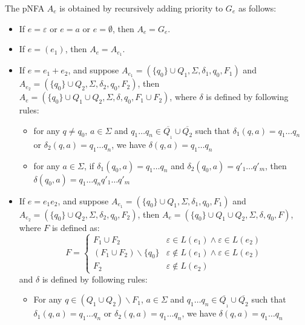 The pNFA $A_e$ is obtained by recursively adding priority to $G_e$ as follows:
\begin{itemize}
  \item If $e = \varepsilon$ or $e = a$ or $e = \emptyset$, then $A_e = G_e$.
  
  \item If $e = (e_1)$, then $A_e = A_{e_1}$.
  
  \item If $e = e_1 + e_2$, and suppose $A_{e_1} = (\{ q_0 \} \cup Q_1,
  \Sigma, \delta_1, q_0, F_1)$ and $A_{e_2} = (\{ q_0 \} \cup Q_2, \Sigma,
  \delta_2, q_0, F_2)$, then $A_e = (\{ q_0 \} \cup Q_1 \cup Q_2, \Sigma,
  \delta, q_0, F_1 \cup F_2)$, where $\delta$ is defined by following rules:
  \begin{itemize}
    \item for any $q \neq q_0$, $a \in \Sigma$ and $q_1 \ldots q_n \in
    \overline{Q_{_1}} \cup \overline{Q_2}$ such that $\delta_1 (q, a) = q_1
    \ldots q_n$ or $\delta_2 (q, a) = q_1 \ldots q_n$, we have $\delta (q, a)
    = q_1 \ldots q_n$
    
    \item for any $a \in \Sigma$, if $\delta_1 (q_0, a) = q_1 \ldots q_n$ and
    $\delta_2 (q_0, a) = q'_1 \ldots q'_m$, then $\delta (q_0, a) = q_1 \ldots
    q_n q'_1 \ldots q'_m$
  \end{itemize}
  \item If $e = e_1 e_2$, and suppose $A_{e_1} = (\{ q_0 \} \cup Q_1, \Sigma,
  \delta_1, q_0, F_1)$ and $A_{e_2} = (\{ q_0 \} \cup Q_2, \Sigma, \delta_2,
  q_0, F_2)$, then $A_e = (\{ q_0 \} \cup Q_1 \cup Q_2, \Sigma, \delta, q_0,
  F)$, where $F$ is defined as:
  \[ F = \left\{ \begin{array}{ll}
       F_1 \cup F_2 & \varepsilon \in L (e_1) \wedge \varepsilon \in L (e_2)\\
       (F_1 \cup F_2) \backslash \{ q_0 \} & \varepsilon \nin L (e_1) \wedge
       \varepsilon \in L (e_2)\\
       F_2 & \varepsilon \nin L (e_2)
     \end{array} \right. \]
  and $\delta$ is defined by following rules:
  \begin{itemize}
    \item For any $q \in (Q_1 \cup Q_2) \backslash F_1$, $a \in \Sigma$ and
    $q_1 \ldots q_n \in \overline{Q_{_1}} \cup \overline{Q_2}$ such that
    $\delta_1 (q, a) = q_1 \ldots q_n$ or $\delta_2 (q, a) = q_1 \ldots q_n$,
    we have $\delta (q, a) = q_1 \ldots q_n$
    

\end{itemize}
\end{itemize}
